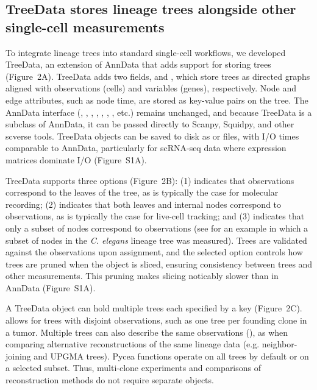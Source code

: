 \subsection*{TreeData stores lineage trees alongside other single-cell measurements}

To integrate lineage trees into standard single-cell workflows, we developed TreeData, an extension of AnnData that adds support for storing trees (Figure~2A). TreeData adds two fields,  and , which store trees as  directed graphs \citep{hagberg2008networkx} aligned with observations (cells) and variables (genes), respectively. Node and edge attributes, such as node time, are stored as key-value pairs on the tree. The AnnData interface (, , , , , , , etc.) remains unchanged, and because TreeData is a subclass of AnnData, it can be passed directly to Scanpy, Squidpy, and other scverse tools. TreeData objects can be saved to disk as  or  files, with I/O times comparable to AnnData, particularly for scRNA-seq data where expression matrices dominate I/O (Figure~S1A).

TreeData supports three  options (Figure~2B): (1)  indicates that observations correspond to the leaves of the tree, as is typically the case for molecular recording; (2)  indicates that both leaves and internal nodes correspond to observations, as is typically the case for live-cell tracking; and (3)  indicates that only a subset of nodes correspond to observations (see  for an example in which a subset of nodes in the \textit{C. elegans} lineage tree was measured). Trees are validated against the observations upon assignment, and the selected  option controls how trees are pruned when the object is sliced, ensuring consistency between trees and other measurements. This pruning makes slicing noticably slower than in AnnData (Figure~S1A).

A TreeData object can hold multiple trees each specified by a key (Figure~2C).  allows for trees with disjoint observations, such as one tree per founding clone in a tumor. Multiple trees can also describe the same observations (), as when comparing alternative reconstructions of the same lineage data (e.g. neighbor-joining and UPGMA trees). Pycea functions operate on all trees by default or on a selected subset. Thus, multi-clone experiments and comparisons of reconstruction methods do not require separate objects.

